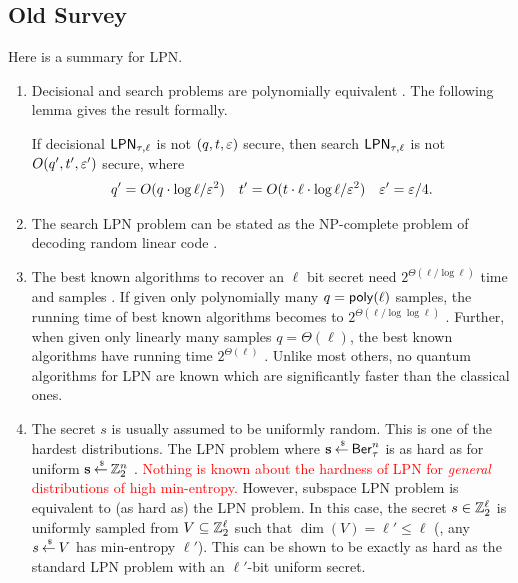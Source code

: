 \subsection{Old Survey}
\noindent Here is a summary for LPN. 
\begin{enumerate}
	\item Decisional and search problems are polynomially equivalent \cite{C:BFKL93,JC:KatShiSmi10}.
	The following lemma gives the result formally.
	
	\begin{importedlemma}
		If decisional $\mathsf{LPN}_{\tau, \ell}$ is not $(q,t,\varepsilon)$ secure, then search $\mathsf{LPN}_{\tau,\ell}$ is not $O(q',t',\varepsilon')$ secure, where
		\begin{align*}
			q' = O(q\cdot \log \ell/\varepsilon^2) & & t' = O(t\cdot \ell \cdot \log \ell/\varepsilon^2) & & \varepsilon' = \varepsilon/4.
		\end{align*}
	\end{importedlemma}
	
	\item The search LPN problem can be stated as the NP-complete problem of decoding random linear code \cite{BerlMcElTilb78}.
	\item The best known algorithms to recover an $ \ell $ bit secret need $ 2^{\Theta(\ell / \log \ell)} $ time and samples \cite{STOC:BluKalWas00,Levieil06}. 
	If given only polynomially many $ q = \mathsf{poly}(\ell) $ samples, the running time of best known algorithms becomes to $ 2^{\Theta(\ell/ \log \log \ell)} $ \cite{Lyubashevsky05}.
	Further, when given only linearly many samples $ q = \Theta(\ell) $, the best known algorithms have running time $ 2^{\Theta(\ell)} $ \cite{AC:MayMeuTho11,Jacques89}. 
	Unlike most others, no quantum algorithms for LPN are known which are significantly faster than the classical ones. 
	
	\item The secret $ s $ is usually assumed to be uniformly random. 
	This is one of the hardest distributions.  
	The LPN problem where $ \mathbf{s} \mathbin{\stackrel{\mbox{\,\tiny \$}}{\gets}} \mathsf{Ber}^n_\tau $ is as hard as for uniform $ \mathbf{s} \mathbin{\stackrel{\mbox{\,\tiny \$}}{\gets}}  {\mathbb Z}^n_2 $ \cite{C:ACPS09}. 
	\textcolor{red}{Nothing is known about the hardness of LPN for \textit{general} distributions of high min-entropy.} 
	However, subspace LPN problem \cite{Piet12} is equivalent to (as hard as) the LPN problem. 
	In this case, the secret $s \in {\mathbb Z}^\ell_2$ is uniformly sampled from $V \subseteq {\mathbb Z}^\ell_2$ such that $\dim(V) = \ell' \leq \ell$ (\ie, any $s \mathbin{\stackrel{\mbox{\,\tiny \$}}{\gets}} V$ has min-entropy $\ell'$).
	This can be shown to be exactly as hard as the standard LPN problem with an $\ell'$-bit uniform secret.
	

\end{enumerate}
